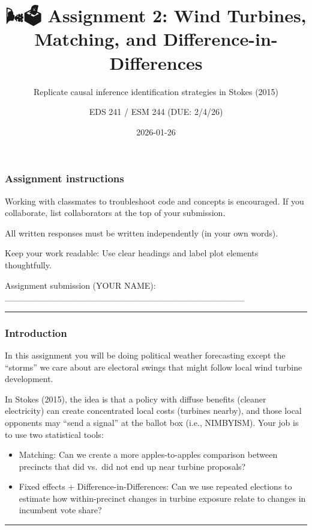 \documentclass[
  letterpaper,
  DIV=11,
  numbers=noendperiod]{scrartcl}
\title{🌬️🗳 Assignment 2: Wind Turbines, Matching, and
Difference-in-Differences}
\subtitle{Replicate causal inference identification strategies in Stokes
(2015)}
\author{EDS 241 / ESM 244 (DUE: 2/4/26)}
\date{2026-01-26}
\providecommand{\tightlist}{%
  \setlength{\itemsep}{0pt}\setlength{\parskip}{0pt}}
\begin{document}
\maketitle


\subsubsection{Assignment instructions}\label{assignment-instructions}

Working with classmates to troubleshoot code and concepts is encouraged.
If you collaborate, list collaborators at the top of your submission.

All written responses must be written independently (in your own words).

Keep your work readable: Use clear headings and label plot elements
thoughtfully.

Assignment submission (YOUR NAME):
\_\_\_\_\_\_\_\_\_\_\_\_\_\_\_\_\_\_\_\_\_\_\_\_\_\_\_\_\_\_\_\_\_\_\_\_\_\_

\begin{center}\rule{0.5\linewidth}{0.5pt}\end{center}

\subsubsection{Introduction}\label{introduction}

In this assignment you will be doing political weather forecasting
except the ``storms'' we care about are electoral swings that might
follow local wind turbine development.

In Stokes (2015), the idea is that a policy with diffuse benefits
(cleaner electricity) can create concentrated local costs (turbines
nearby), and those local opponents may ``send a signal'' at the ballot
box (i.e., NIMBYISM). Your job is to use two statistical tools:

\begin{itemize}
\tightlist
\item
  Matching: Can we create a more apples-to-apples comparison between
  precincts that did vs.~did not end up near turbine proposals?
\item
  Fixed effects + Difference-in-Differences: Can we use repeated
  elections to estimate how within-precinct changes in turbine exposure
  relate to changes in incumbent vote share?
\end{itemize}

\begin{center}\rule{0.5\linewidth}{0.5pt}\end{center}
\end{document}

